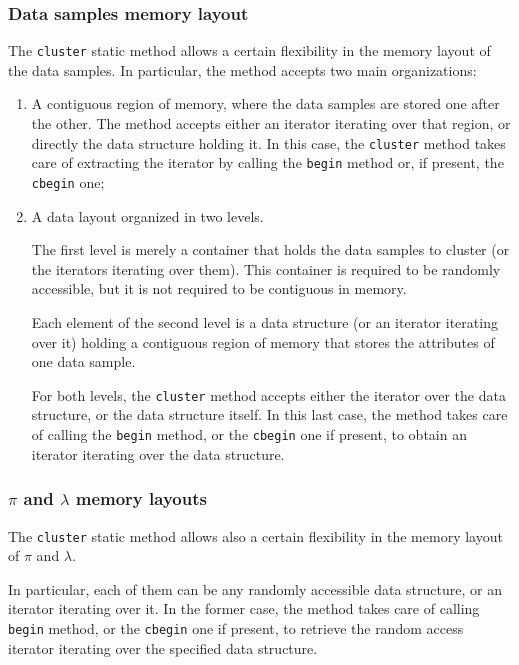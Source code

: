 \documentclass{article}
\begin{document}
\hypertarget{par-data-samples-layout}{
\subsubsection{Data samples memory layout}
\label{par-data-samples-layout}}

The \texttt{cluster} static method allows a certain flexibility in the memory layout of the data
samples. In particular, the method accepts two main organizations:
\begin{enumerate}
\item A contiguous region of memory, where the data samples are stored one after the other.
The method accepts either an iterator iterating over that region, or directly the data
structure holding it. In this case, the \texttt{cluster} method takes care of extracting the
iterator by calling the \texttt{begin} method or, if present, the \texttt{cbegin} one;

\item A data layout organized in two levels.

The first level is merely a container that holds the data samples to cluster (or the iterators
iterating over them). This container is required to be randomly accessible, but it is not
required to be contiguous in memory.

Each element of the second level is a data structure (or an iterator iterating over it) holding a
contiguous region of memory that stores the attributes of one data sample.

For both levels, the \texttt{cluster} method accepts either the iterator over the data structure, or
the data structure itself. In this last case, the method takes care of calling the
\texttt{begin} method, or the \texttt{cbegin} one if present, to obtain an iterator iterating
over the data structure.

\end{enumerate}

\hypertarget{par-pi-lambda-layout}{
\subsubsection{\texorpdfstring{\boldmath$\pi$ and \boldmath$\lambda$}{pi and lambda} memory layouts}
\label{par-pi-lambda-layout}}

The \texttt{cluster} static method allows also a certain flexibility in the memory layout of
$\pi$ and $\lambda$.

In particular, each of them can be any randomly accessible data structure, or an iterator
iterating over it.
In the former case, the method takes care of calling \texttt{begin} method, or the
\texttt{cbegin} one if present, to retrieve the random access iterator iterating over the
specified data structure.
\end{document}
